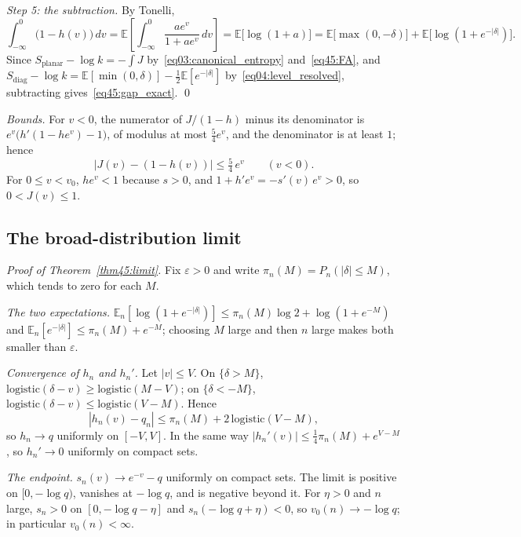 \documentclass[11pt,letterpaper]{article}
\theoremstyle{plain}
\theoremstyle{definition}
\theoremstyle{remark}
\begin{document}
\emph{Step 5: the subtraction.} By Tonelli,
\begin{equation}
\int_{-\infty}^0 \big(1 - h(v)\big)\, dv = \mathbb{E}\!\left[\int_{-\infty}^0 \frac{a e^{v}}{1 + a e^{v}}\, dv\right] = \mathbb{E}\big[\log(1 + a)\big] = \mathbb{E}\big[\max(0,-\delta)\big] + \mathbb{E}\big[\log(1 + e^{-|\delta|})\big].
\end{equation}
Since $S_{\mathrm{planar}} - \log k = -\int J$ by~\eqref{eq03:canonical_entropy} and~\eqref{eq45:FA}, and $S_{\mathrm{diag}} - \log k = \mathbb{E}[\min(0,\delta)] - \tfrac12\mathbb{E}[e^{-|\delta|}]$ by~\eqref{eq04:level_resolved}, subtracting gives~\eqref{eq45:gap_exact}. \qed

\emph{Bounds.} For $v < 0$, the numerator of $J/(1-h)$ minus its denominator is $e^{v}\big(h'(1 - h e^{v}) - 1\big)$, of modulus at most $\tfrac54 e^{v}$, and the denominator is at least $1$; hence
\begin{equation}
\label{eqD:bound_neg}
\big|J(v) - (1 - h(v))\big| \le \tfrac54\, e^{v} \qquad (v < 0).
\end{equation}
For $0 \le v < v_0$, $h e^{v} < 1$ because $s > 0$, and $1 + h' e^{v} = -s'(v)\, e^{v} > 0$, so $0 < J(v) \le 1$.

\subsection{The broad-distribution limit}
\label{subsecD:limit}

\emph{Proof of Theorem~\ref{thm45:limit}.} Fix $\varepsilon > 0$ and write $\pi_n(M) = P_n(|\delta| \le M)$, which tends to zero for each $M$.

\emph{The two expectations.} $\mathbb{E}_n[\log(1 + e^{-|\delta|})] \le \pi_n(M)\log 2 + \log(1 + e^{-M})$ and $\mathbb{E}_n[e^{-|\delta|}] \le \pi_n(M) + e^{-M}$; choosing $M$ large and then $n$ large makes both smaller than $\varepsilon$.

\emph{Convergence of $h_n$ and $h_n'$.} Let $|v| \le V$. On $\{\delta > M\}$, $\mathrm{logistic}(\delta - v) \ge \mathrm{logistic}(M - V)$; on $\{\delta < -M\}$, $\mathrm{logistic}(\delta - v) \le \mathrm{logistic}(V - M)$. Hence
\begin{equation}
|h_n(v) - q_n| \le \pi_n(M) + 2\,\mathrm{logistic}(V - M),
\end{equation}
so $h_n \to q$ uniformly on $[-V, V]$. In the same way $|h_n'(v)| \le \tfrac14 \pi_n(M) + e^{V - M}$, so $h_n' \to 0$ uniformly on compact sets.

\emph{The endpoint.} $s_n(v) \to e^{-v} - q$ uniformly on compact sets. The limit is positive on $[0, -\log q)$, vanishes at $-\log q$, and is negative beyond it. For $\eta > 0$ and $n$ large, $s_n > 0$ on $[0, -\log q - \eta]$ and $s_n(-\log q + \eta) < 0$, so $v_0(n) \to -\log q$; in particular $v_0(n) < \infty$.
\end{document}
